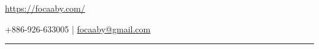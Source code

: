 \documentclass[]{deedy-resume-openfont}
\begin{document}
%
%

%
%


\begin{minipage}{0.6\textwidth}
\end{minipage}
\hfill
\begin{minipage}{0.4\textwidth}
    \begin{tightemize}
        \item[] \href{https://focaaby.com/}{https://focaaby.com/}
        \item[] +886-926-633005 | \href{mailto:focaaby@gmail.com}{focaaby@gmail.com}
    \end{tightemize}
\end{minipage}

\par\noindent\rule{\textwidth}{0.5pt} %

%
%
\end{document}
